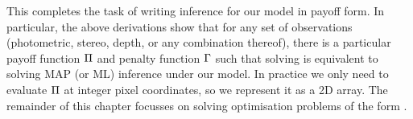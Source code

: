 This completes the task of writing inference for our model in payoff
form. In particular, the above derivations show that for any set of
observations (photometric, stereo, depth, or any combination thereof),
there is a particular payoff function $\ScenePayoff$ and penalty
function $\ScenePenalty$ such that solving  is
equivalent to solving MAP (or ML) inference under our model. In
practice we only need to evaluate $\ScenePayoff$ at integer pixel
coordinates, so we represent it as a 2D array. The remainder of this
chapter focusses on solving optimisation problems of the form
.










